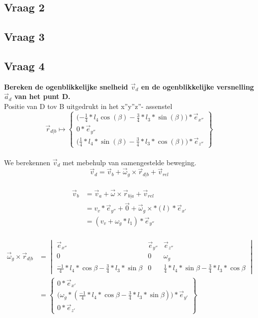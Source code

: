 \documentclass[a4paper,10pt]{article}
\begin{document}
\subsection{Vraag 2}

\subsection{Vraag 3}


\subsection{Vraag 4}
\textbf{Bereken de ogenblikkelijke snelheid $\vec{v}_d$ en de ogenblikkelijke versnelling $\vec{a}_d$ van het punt D.}\\
Positie van D tov B uitgedrukt in het x''y''z''- assenstel\\
\begin{equation}
	\vec{r}_{d|b} \mapsto \begin{Bmatrix}
	\Big({-\frac{1}{4}} * l_4 \cos(\beta)-\frac{3}{4}*l_3*\sin(\beta)\Big)*\vec{e}_{x''}\\
	0 * \vec{e}_{y''}\\
	\Big (\frac{1}{4}*l_4 *\sin(\beta) - \frac{3}{4}*l_3*\cos(\beta)\Big) * \vec{e}_{z''}
	\end{Bmatrix}
\end{equation}\\
We berekennen $\vec{v}_d$ met mebehulp van samengestelde beweging.\\
\begin{equation}
\vec{v}_d = \vec{v}_b + \vec{\omega}_g \times \vec{r}_{d|b}  +\vec{v}_{rel}
\end{equation}\\
\begin{equation}
\begin{aligned}
\vec{v}_b &= \vec{v}_a + \vec{\omega}\times\vec{r}_{b|a} + \vec{v}_{rel}\\
&= v_v * \vec{e}_{y''} + \vec{0} + \vec{\omega}_g \times * (l) *\vec{e}_{x'}\\
&= (v_v + \omega_g * l_1)*\vec{e}_{y''}
\end{aligned}
\end{equation}\\
\begin{equation}
\begin{aligned}
\vec{\omega}_g \times \vec{r}_{d|b} & = \begin{vmatrix}
\vec{e}_{x''}& \vec{e}_{y''} & \vec{e}_{z''}\\
0 & 0 & \omega_g \\
\frac{-1}{4}*l_4*\cos{\beta} - \frac{3}{4}*l_3 * \sin{\beta} & 0 &\frac{1}{4}*l_4 *\sin{\beta}-\frac{3}{4}*l_3 * \cos{\beta}
\end{vmatrix}\\
&= \begin{Bmatrix}
0 *\vec{e}_{x'}\\
\Big(\omega_g*(\frac{-1}{4}*l_4*\cos{\beta}-\frac{3}{4}*l_3*\sin{\beta})\Big)*\vec{e}_{y'}\\
0 * \vec{e}_{z'}
\end{Bmatrix}
\end{aligned}
\end{equation}\\
\end{document}
